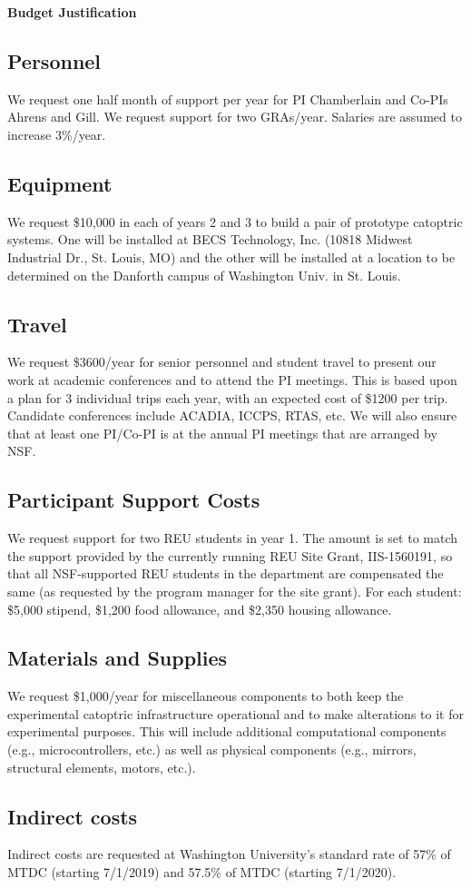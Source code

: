 \documentclass[11pt]{article}
\begin{document}
\pagestyle{empty}
\thispagestyle{empty}

\begin{center}
\textbf{\Large Budget Justification}
\end{center}

\subsection*{Personnel}
We request one half month of support per year for PI Chamberlain and Co-PIs
Ahrens and Gill.
We request support for two GRAs/year. Salaries are 
assumed to increase 3\%/year. 

\subsection*{Equipment}
We request \$10,000 in each of years 2 and 3 to build a pair of
prototype catoptric systems.  One will be installed at
BECS Technology, Inc. (10818 Midwest Industrial Dr., St. Louis, MO)
and the other will be installed at a location to be determined on
the Danforth campus of Washington Univ. in St. Louis.

\subsection*{Travel}
We request \$3600/year for senior personnel and student travel
to present our work at academic 
conferences and to attend the PI meetings.
This is based upon a plan for 3 individual trips
each year, with an expected cost of \$1200 per trip.
Candidate conferences include ACADIA, ICCPS, RTAS, etc.
We will also ensure that at least one PI/Co-PI is
at the annual PI meetings that are arranged by NSF. 

\subsection*{Participant Support Costs}
We request support for two REU students in year 1. 
The amount is set to match the support provided by the currently
running REU Site Grant, IIS-1560191, so that all NSF-supported REU
students in the department are compensated the same (as requested by
the program manager for the site grant).
For each student: \$5,000 stipend, \$1,200 food allowance, and \$2,350
housing allowance.

\subsection*{Materials and Supplies}
We request \$1,000/year for
miscellaneous components to both keep the experimental catoptric
infrastructure operational and to make alterations to it for
experimental purposes. This will
include additional computational components (e.g., microcontrollers, etc.)
as well as physical components (e.g., mirrors, structural elements, motors,
etc.).

\subsection*{Indirect costs}
Indirect costs are requested at Washington University's standard rate of
57\% of MTDC (starting 7/1/2019) and 57.5\% of MTDC (starting 7/1/2020).
\end{document}
